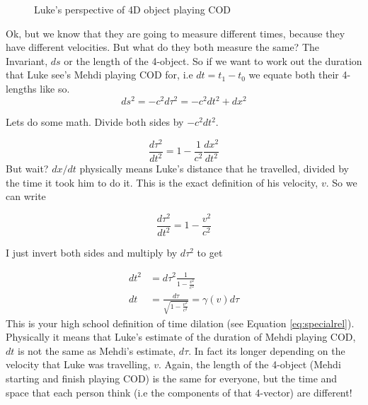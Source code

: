 \begin{figure}[h]
  \centering
{}
\caption{Luke's perspective of 4D object playing COD}
\label{fig:L4d}
\end{figure}

Ok, but we know that they are going to measure different times, because they have different velocities. But what do they both measure the same? The Invariant, $ds$ or the length of the 4-object. So if we want to work out the duration that Luke see's Mehdi playing COD for, i.e $dt = t_1 - t_0$ we equate both their 4-lengths like so. 
\begin{equation}
  ds^2 = -c^2 d\tau^2 = -c^2 dt^2 + dx^2
\end{equation}

Lets do some math. Divide both sides by $-c^2 dt^2$. 

\begin{equation}
  \frac{d\tau^2}{dt^2} = 1  - \frac{1}{c^2} \frac{dx^2}{dt^2}
\end{equation}
But wait? $dx/dt$ physically means Luke's distance that he travelled, divided by the time it took him to do it. This is the exact definition of his velocity, $v$. So we can write

\begin{equation}
  \frac{d\tau^2}{dt^2} = 1  - \frac{v^2}{c^2}
  \label{eq:u0}
\end{equation}

I just invert both sides and multiply by $d\tau^2$ to get

\begin{equation}
  \begin{aligned}
  dt^2 &= d\tau^2 \frac{1}{1  - \frac{v^2}{c^2}} \\
  dt &= \frac{d \tau}{\sqrt{1 - \frac{v^2}{c^2}}} = \gamma(v) d\tau
\end{aligned}
\end{equation}
This is your high school definition of time dilation (see Equation \eqref{eq:specialrel}). Physically it means that Luke's estimate of the duration of Mehdi playing COD, $dt$ is not the same as Mehdi's estimate, $d\tau$. In fact its longer depending on the velocity that Luke was travelling, $v$. Again, the length of the 4-object (Mehdi starting and finish playing COD) is the same for everyone, but the time and space that each person think (i.e the components of that 4-vector) are different!

